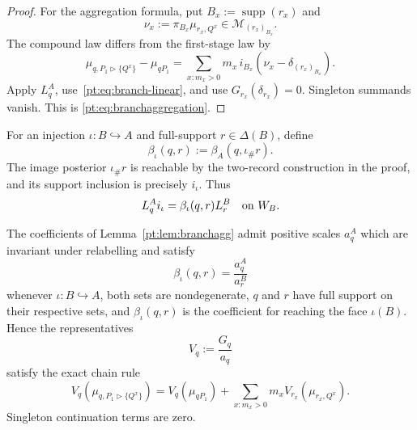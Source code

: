 \begin{proof}
For the aggregation formula, put $B_x:=\operatorname{supp}(r_x)$ and
\[
 \nu_x:=\pi_{B_x}\mu_{r_x,Q^x}\in\mathcal M_{(r_x)_{B_x}}.
\]
The compound law differs from the first-stage law by
\[
 \mu_{q,P_1\triangleright\{Q^x\}}-\mu_{qP_1}
 =\sum_{x:m_x>0}m_x\,i_{B_x}
   (\nu_x-\delta_{(r_x)_{B_x}}).
\]
Apply $L_q^A$, use~\eqref{pt:eq:branch-linear}, and use
$G_{r_x}(\delta_{r_x})=0$.  Singleton summands vanish.  This is
\eqref{pt:eq:branchaggregation}.
\end{proof}

For an injection $\iota:B\hookrightarrow A$ and full-support
$r\in\Delta(B)$, define
\[
 \beta_\iota(q,r):=\beta_A(q,\iota_\#r).
\]
The image posterior $\iota_\#r$ is reachable by the two-record construction
in the proof, and its support inclusion is precisely $i_\iota$.  Thus
\[
 L_q^A i_\iota=\beta_\iota(q,r)L_r^B
 \quad\hbox{on }W_B.
\]

\begin{lemma}
\label{pt:lem:chain}
The coefficients of Lemma~\ref{pt:lem:branchagg} admit positive scales
$a_q^A$ which are invariant under relabelling and satisfy
\begin{equation}
 \beta_\iota(q,r)=\frac{a_q^A}{a_r^B}
\tag{FS}\label{pt:eq:facescale}
\end{equation}
whenever $\iota:B\hookrightarrow A$, both sets are nondegenerate, $q$ and
$r$ have full support on their respective sets, and $\beta_\iota(q,r)$ is the
coefficient for reaching the face $\iota(B)$.  Hence the representatives
\[
 V_q:=\frac{G_q}{a_q}
\]
satisfy the exact chain rule
\begin{equation}
 V_q(\mu_{q,P_1\triangleright\{Q^x\}})
 =V_q(\mu_{qP_1})
  +\sum_{x:m_x>0}m_xV_{r_x}(\mu_{r_x,Q^x}).
\tag{CR}\label{pt:eq:chainrule}
\end{equation}
Singleton continuation terms are zero.
\end{lemma}

